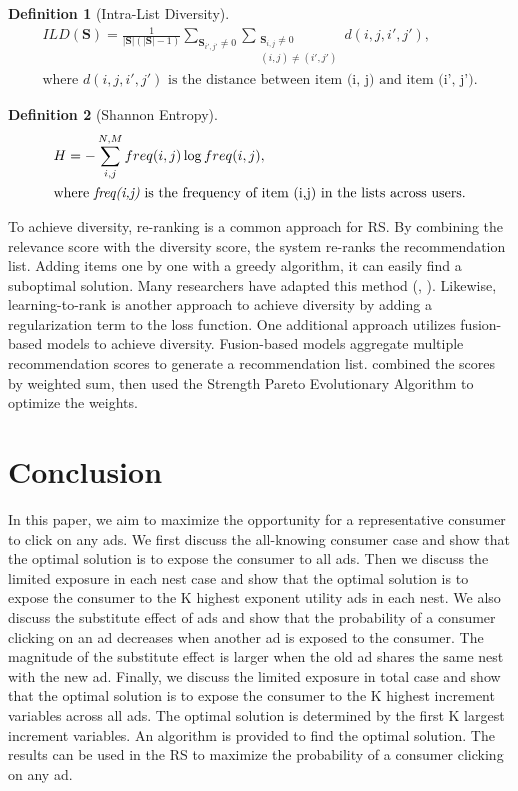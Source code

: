 \documentclass[12pt]{article}
\theoremstyle{definition}
\newtheorem{definition}{Definition}[section]
\newcommand{\matr}[1]{\mathbf{#1}} %
\begin{document}
\begin{sloppypar}
\begin{definition}[Intra-List Diversity]
    \begin{align*}
        ILD(\matr{S}) = \frac{1}{|\matr{S}|(|\matr{S}|-1)}\sum_{\matr{S}_{i',j'}\neq 0}\sum_{\substack{\matr{S}_{i,j}\neq 0\\ (i,j)\neq(i',j')}}d(i, j, i', j'), \\
        \text{where $d(i, j, i', j')$ is the distance between item (i, j) and item (i', j').}
    \end{align*}
\end{definition}

\begin{definition}[Shannon Entropy]
    \begin{align*}
        &H = -\sum_{i,j}^{N,M} freq(i,j) \log freq(i,j),\\
        &\text{where \textit{freq(i,j)} is the frequency of item (i,j) in the lists across users.}
    \end{align*}
\end{definition}

To achieve diversity, re-ranking is a common approach for RS. By combining the relevance score with the diversity score, the system re-ranks the recommendation list. Adding items one by one with a greedy algorithm, it can easily find a suboptimal solution. Many researchers have adapted this method (\textcite{10.1145/1772690.1772780}, \textcite{10.1007/3-540-44593-5_25}). Likewise, learning-to-rank is another approach to achieve diversity by adding a regularization term to the loss function. One additional approach utilizes fusion-based models to achieve diversity. Fusion-based models aggregate multiple recommendation scores to generate a recommendation list. \textcite{10.1145/2365952.2365962} combined the scores by weighted sum, then used the Strength Pareto Evolutionary Algorithm to optimize the weights.

\section{Conclusion}
In this paper, we aim to maximize the opportunity for a representative consumer to click on any ads. We first discuss the all-knowing consumer case and show that the optimal solution is to expose the consumer to all ads. Then we discuss the limited exposure in each nest case and show that the optimal solution is to expose the consumer to the K highest exponent utility ads in each nest. We also discuss the substitute effect of ads and show that the probability of a consumer clicking on an ad decreases when another ad is exposed to the consumer. The magnitude of the substitute effect is larger when the old ad shares the same nest with the new ad. Finally, we discuss the limited exposure in total case and show that the optimal solution is to expose the consumer to the K highest increment variables across all ads. The optimal solution is determined by the first K largest increment variables. An algorithm is provided to find the optimal solution. The results can be used in the RS to maximize the probability of a consumer clicking on any ad.


\end{sloppypar}
\end{document}
